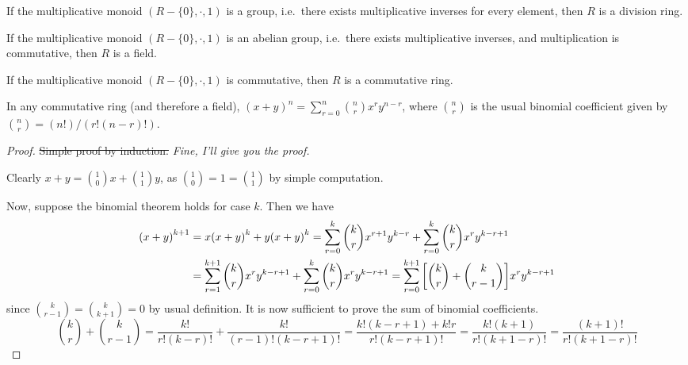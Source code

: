 \begin{definition}
    If the multiplicative monoid \((R - \{0\},\cdot,1)\) is a group,
    i.e.\ there exists multiplicative inverses for every element,
    then \(R\) is a division ring.
\end{definition}
\begin{definition}
    If the multiplicative monoid \((R - \{0\},\cdot,1)\) is an abelian group,
    i.e.\ there exists multiplicative inverses,
    and multiplication is commutative,
    then \(R\) is a field.
\end{definition}
\begin{definition}
    If the multiplicative monoid \((R - \{0\},\cdot,1)\) is commutative,
    then \(R\) is a commutative ring.
\end{definition}
\begin{proposition}\label{prop:binom}
    In any commutative ring (and therefore a field),
    \({(x+y)}^n = \sum_{r=0}^n \binom{n}{r} x^r y^{n-r}\),
    where \(\binom{n}{r}\) is the usual binomial coefficient
    given by \(\binom{n}{r} = (n!)/(r!(n-r)!)\).
\end{proposition}
\begin{proof}
    \sout{Simple proof by induction.}
    \textit{Fine, I'll give you the proof.}

    Clearly \(x+y = \binom{1}{0}x + \binom{1}{1}y\),
    as \(\binom{1}{0} = 1 = \binom{1}{1}\) by simple computation.

    Now, suppose the binomial theorem holds for case \(k\).
    Then we have
    \begin{align*}
        {(x+y)}^{k+1} &= x{(x+y)}^k + y{(x+y)}^k
        = \sum_{r=0}^k \binom{k}{r} x^{r+1} y^{k-r}
        + \sum_{r=0}^k \binom{k}{r} x^r y^{k-r+1} \\
        &= \sum_{r=1}^{k+1} \binom{k}{r} x^r y^{k-r+1}
        + \sum_{r=0}^k \binom{k}{r} x^r y^{k-r+1}
        = \sum_{r=0}^{k+1} \qty[\binom{k}{r}+\binom{k}{r-1}]x^r y^{k-r+1}
    \end{align*}
    since \(\binom{k}{r-1} = \binom{k}{k+1} = 0\) by usual definition.
    It is now sufficient to prove the sum of binomial coefficients.
    \begin{equation*}
        \binom{k}{r}+\binom{k}{r-1}
        = \frac{k!}{r!(k-r)!} + \frac{k!}{(r-1)!(k-r+1)!}
        = \frac{k!(k-r+1) + k!r}{r!(k-r+1)!}
        = \frac{k!(k+1)}{r!(k+1-r)!}
        = \frac{(k+1)!}{r!(k+1-r)!}
    \end{equation*}
\end{proof}

